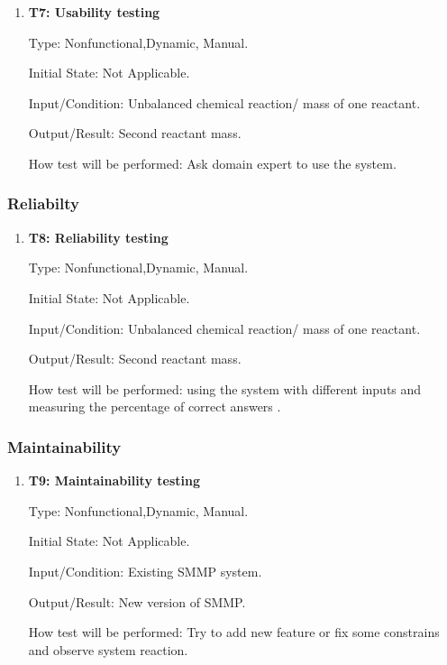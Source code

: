 \documentclass[12pt, titlepage]{article}
\begin{document}
\begin{enumerate}

\item{\bf T7: Usability testing\\}

Type: Nonfunctional,Dynamic, Manual.
					
Initial State:  Not Applicable.
					
Input/Condition:  Unbalanced chemical reaction/ mass of one reactant.
					
Output/Result:  Second reactant mass.
					
How test will be performed: Ask domain expert to use the system.
					

\end{enumerate}

\subsubsection{Reliabilty}


\begin{enumerate}

\item{\bf T8: Reliability testing\\}

Type: Nonfunctional,Dynamic, Manual.
					
Initial State:  Not Applicable.
					
Input/Condition:  Unbalanced chemical reaction/ mass of one reactant.
					
Output/Result:  Second reactant mass.
					
How test will be performed: using the system with different inputs and measuring the percentage of correct answers . 
\end{enumerate}

\subsubsection{Maintainability}


\begin{enumerate}

\item{\bf T9: Maintainability testing\\}

Type: Nonfunctional,Dynamic, Manual.
					
Initial State:  Not Applicable.
					
Input/Condition:  Existing SMMP system.
					
Output/Result:  New version of SMMP.
					
How test will be performed: Try to add new feature or fix some constrains and observe system reaction.

\end{enumerate}
\end{document}
